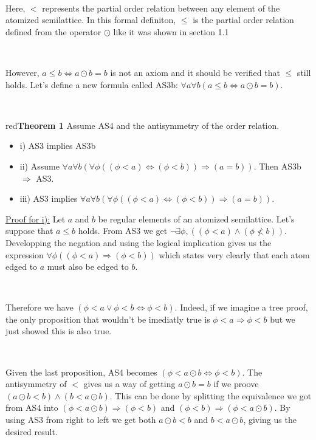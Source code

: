 \documentclass[a4paper, 11pt]{article}
\begin{document}
\


Here, $<$ represents the partial order relation between any element of the atomized semilattice. In this formal definiton, $\leq$ is the partial order relation defined from  the operator $\odot$ like it was shown in section 1.1

\

However, $a \leq b \Leftrightarrow a \odot b = b$ is not an axiom and it should be verified that $\leq$ still holds. Let's define a new formula called AS3b: $\forall a \forall b (a \leq b \Leftrightarrow a \odot b = b)$.

\

\begin{mybox}{red}{\textbf{Theorem 1}}
	Assume AS4 and the antisymmetry of the order relation.
	\begin{itemize} 
		\item i) AS3 implies AS3b
		\item ii) Assume $\forall a \forall b (\forall \phi (( \phi < a ) \Leftrightarrow (\phi < b)) \Rightarrow (a = b))$. Then AS3b $\Rightarrow$ AS3.
		\item iii) AS3 implies $\forall a \forall b ( \forall \phi ((\phi < a) \Leftrightarrow (\phi < b)) \Rightarrow (a = b))$.
	\end{itemize}
\end{mybox}

\noindent
\underline{Proof for i):} Let $a$ and $b$ be regular elements of an atomized semilattice. Let's suppose that $a \leq b$ holds. From AS3 we get $\neg \exists \phi, ((\phi < a) \land (\phi \not < b))$. Developping the negation and using the logical implication gives us the expression $\forall \phi ((\phi < a) \Rightarrow (\phi < b))$ which states very clearly that each atom edged to $a$ must also be edged to $b$.

\

Therefore we have $(\phi < a \lor \phi < b \Leftrightarrow \phi < b)$. Indeed, if we imagine a tree proof, the only proposition that wouldn't be imediatly true is $\phi < a \Rightarrow \phi < b$ but we just showed this is also true.

\

Given the last proposition, AS4 becomes $(\phi < a \odot b \Leftrightarrow \phi < b)$. The antisymmetry of $<$ gives us a way of getting $a \odot b = b$ if we proove $(a \odot b < b) \land (b < a \odot b)$. This can be done by splitting the equivalence we got from AS4 into $(\phi < a \odot b) \Rightarrow (\phi < b)$ and $(\phi < b) \Rightarrow (\phi < a \odot b)$. By using AS3 from right to left we get both $a \odot b < b$ and $b < a \odot b$, giving us the desired result.
\end{document}
